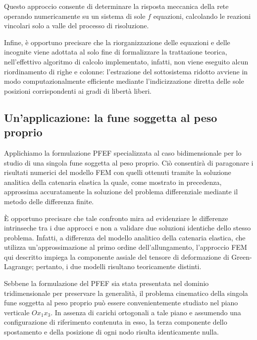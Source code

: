 Questo approccio consente di determinare la risposta meccanica della rete operando numericamente su un sistema di sole $f$ equazioni, calcolando le reazioni vincolari solo a valle del processo di risoluzione.

Infine, è opportuno precisare che la riorganizzazione delle equazioni e delle incognite viene adottata al solo fine di formalizzare la trattazione teorica, nell'effettivo algoritmo di calcolo implementato, infatti, non viene eseguito alcun riordinamento di righe e colonne: l'estrazione del sottosistema ridotto avviene in modo computazionalmente efficiente mediante l'indicizzazione diretta delle sole posizioni corrispondenti ai gradi di libertà liberi.


\subsection{Un'applicazione: la fune soggetta al peso proprio}
Applichiamo la formulazione PFEF specializzata al caso bidimensionale per lo studio di una singola fune soggetta al peso proprio. Ciò consentirà di paragonare i risultati numerici del modello FEM con quelli ottenuti tramite la soluzione analitica della catenaria elastica la quale, come mostrato in precedenza, approssima accuratamente la soluzione del problema differenziale mediante il metodo delle differenza finite.

\`E opportuno precisare che tale confronto mira ad evidenziare le differenze intrinseche tra i due approcci e non a validare due soluzioni identiche dello stesso problema. Infatti, a differenza del modello analitico della catenaria elastica, che utilizza un'approssimazione al primo ordine dell'allungamento, l'approccio FEM qui descritto impiega la componente assiale del tensore di deformazione di Green-Lagrange; pertanto, i due modelli risultano teoricamente distinti. 

\vspace{1em}
Sebbene la formulazione del PFEF sia stata presentata nel dominio tridimensionale per preservare la generalità, il problema cinematico della singola fune soggetta al peso proprio può essere convenientemente studiato nel piano verticale $Ox_1x_3$. In assenza di carichi ortogonali a tale piano e assumendo una configurazione di riferimento contenuta in esso, la terza componente dello spostamento e della posizione di ogni nodo risulta identicamente nulla. 

